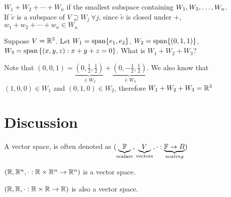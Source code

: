 \begin{remark}
    $W_1 + W_2 + \cdots + W_n$ if the smallest subspace containing ${W}_1,{W}_2, \ldots, {W}_{n}$. \\
    If $\tilde v$ is a subspace of $V \supseteq W_j \ \forall j$, since $\tilde v$ is closed under $+$, $w_1 + w_2 + \cdots + w_n \in W_n$
\end{remark}
\begin{example}
Suppose $V = \mathbb R^3$. Let $W_1 = \text{span} \{e_1, e_2\}$, $W_2 = \text{span} \{(0,1,1)\}$, $W_3 = \text{span} \left\{ (x,y,z) : x + y + z = 0 \right\}$. 
What is $W_1 + W_2 + W_3$?
\end{example}
Note that $(0,0,1) = \underbrace{\left(0,\frac12,\frac12\right)}_{\in W_2} +  \underbrace{\left(0,-\frac12,\frac12\right)}_{\in W_3}$. We also know that $(1,0,0) \in W_1$ and $(0,1,0) \in W_2$, therefore $W_1 + W_2 + W_3 = \mathbb R^3$ \\
\section*{Discussion}
\begin{definition}
    A vector space, is often denoted as $(\underbrace{\mathbb F}_{\text{scalars}}, \underbrace{V}_{\text{vectors}}, \cdot : \underbrace{\mathbb F \to B}_{scaling})$
\end{definition}
\begin{example}
    $(\mathbb R,\mathbb R^n, \cdot : \mathbb R \times \mathbb R^n \to \mathbb R^n)$ is a vector space.
\end{example}
\begin{example}
    $(\mathbb R, \mathbb R, \cdot : \mathbb R \times \mathbb R \to \mathbb R)$ is also a vector space.
\end{example}
